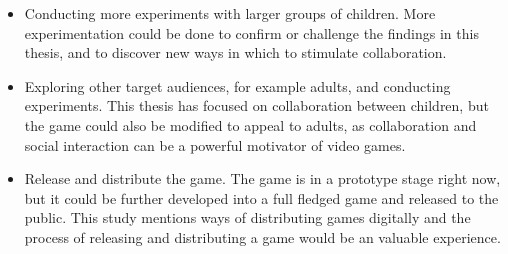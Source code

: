 \begin{itemize}
	\item Conducting more experiments with larger groups of children. More experimentation could be done to confirm or challenge the findings in this thesis, and to discover new ways in which to stimulate collaboration.
	
	\item Exploring other target audiences, for example adults, and conducting experiments. This thesis has focused on collaboration between children, but the game could also be modified to appeal to adults, as collaboration and social interaction can be a powerful motivator of video games.
	
	\item Release and distribute the game. The game is in a prototype stage right now, but it could be further developed into a full fledged game and released to the public. This study mentions ways of distributing games digitally and the process of releasing and distributing a game would be an valuable experience.
\end{itemize}
